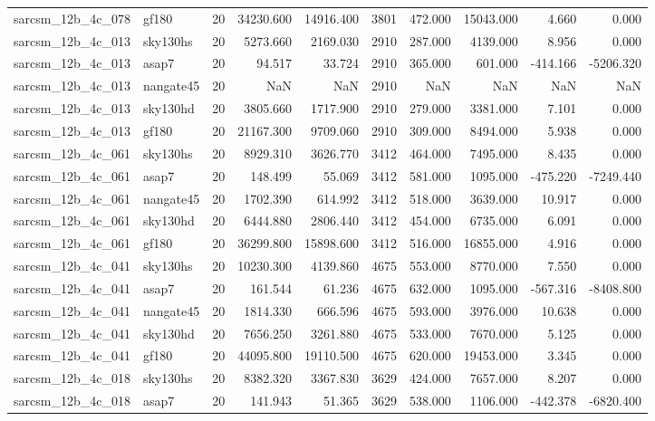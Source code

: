 \documentclass{article}
\begin{document}
\begin{longtable}{llrrrrrrrr}
sarcsm\_12b\_4c\_078 & gf180 & 20 & 34230.600 & 14916.400 & 3801 & 472.000 & 15043.000 & 4.660 & 0.000 \\
sarcsm\_12b\_4c\_013 & sky130hs & 20 & 5273.660 & 2169.030 & 2910 & 287.000 & 4139.000 & 8.956 & 0.000 \\
sarcsm\_12b\_4c\_013 & asap7 & 20 & 94.517 & 33.724 & 2910 & 365.000 & 601.000 & -414.166 & -5206.320 \\
sarcsm\_12b\_4c\_013 & nangate45 & 20 & NaN & NaN & 2910 & NaN & NaN & NaN & NaN \\
sarcsm\_12b\_4c\_013 & sky130hd & 20 & 3805.660 & 1717.900 & 2910 & 279.000 & 3381.000 & 7.101 & 0.000 \\
sarcsm\_12b\_4c\_013 & gf180 & 20 & 21167.300 & 9709.060 & 2910 & 309.000 & 8494.000 & 5.938 & 0.000 \\
sarcsm\_12b\_4c\_061 & sky130hs & 20 & 8929.310 & 3626.770 & 3412 & 464.000 & 7495.000 & 8.435 & 0.000 \\
sarcsm\_12b\_4c\_061 & asap7 & 20 & 148.499 & 55.069 & 3412 & 581.000 & 1095.000 & -475.220 & -7249.440 \\
sarcsm\_12b\_4c\_061 & nangate45 & 20 & 1702.390 & 614.992 & 3412 & 518.000 & 3639.000 & 10.917 & 0.000 \\
sarcsm\_12b\_4c\_061 & sky130hd & 20 & 6444.880 & 2806.440 & 3412 & 454.000 & 6735.000 & 6.091 & 0.000 \\
sarcsm\_12b\_4c\_061 & gf180 & 20 & 36299.800 & 15898.600 & 3412 & 516.000 & 16855.000 & 4.916 & 0.000 \\
sarcsm\_12b\_4c\_041 & sky130hs & 20 & 10230.300 & 4139.860 & 4675 & 553.000 & 8770.000 & 7.550 & 0.000 \\
sarcsm\_12b\_4c\_041 & asap7 & 20 & 161.544 & 61.236 & 4675 & 632.000 & 1095.000 & -567.316 & -8408.800 \\
sarcsm\_12b\_4c\_041 & nangate45 & 20 & 1814.330 & 666.596 & 4675 & 593.000 & 3976.000 & 10.638 & 0.000 \\
sarcsm\_12b\_4c\_041 & sky130hd & 20 & 7656.250 & 3261.880 & 4675 & 533.000 & 7670.000 & 5.125 & 0.000 \\
sarcsm\_12b\_4c\_041 & gf180 & 20 & 44095.800 & 19110.500 & 4675 & 620.000 & 19453.000 & 3.345 & 0.000 \\
sarcsm\_12b\_4c\_018 & sky130hs & 20 & 8382.320 & 3367.830 & 3629 & 424.000 & 7657.000 & 8.207 & 0.000 \\
sarcsm\_12b\_4c\_018 & asap7 & 20 & 141.943 & 51.365 & 3629 & 538.000 & 1106.000 & -442.378 & -6820.400 \\

\end{longtable}
\end{document}
